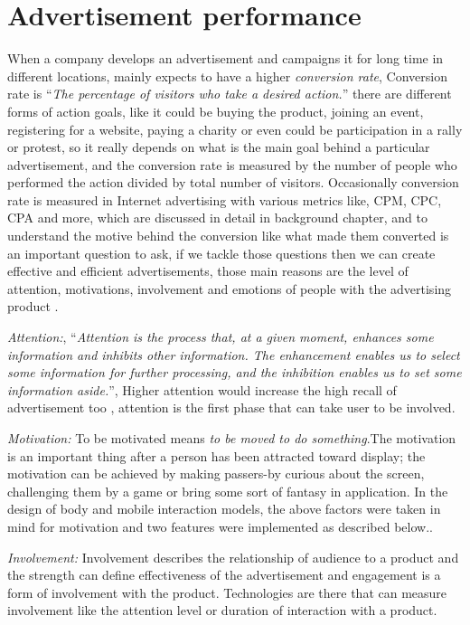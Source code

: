 \section{Advertisement performance}
When a company develops an advertisement and campaigns it for long time in different locations, mainly expects to have a higher \emph{conversion rate}, Conversion rate is ``\emph{The percentage of visitors who take a desired action.}''\cite{convrate} there are different forms of action goals, like it could be buying the product, joining an event, registering for a website, paying a charity or even could be participation in a rally or protest, so it really depends on what is the main goal behind a particular advertisement, and the conversion rate is measured by the number of people who performed the action divided by total number of visitors. Occasionally conversion rate is measured in Internet advertising with various metrics like, CPM, CPC, CPA and more, which are discussed in detail in background chapter, and to understand the motive behind the conversion like what made them converted is an important question to ask, if we tackle those questions then we can create effective and efficient advertisements, those main reasons are the level of attention, motivations, involvement and emotions of people with the advertising product \cite{pervasiv_ad}.

\emph{Attention:}, ``\emph{Attention is the process that, at a given moment, enhances some information and inhibits other information. The enhancement enables us to select some information for further processing, and the inhibition enables us to set some information aside.}''\cite{Attention}, Higher attention would increase the high recall of advertisement too \cite{add_effectivenss}, attention is the first phase that can take user to be involved.

\emph{Motivation:}
To be motivated means \emph{to be moved to do something}\cite{motiv}.The motivation is an important thing after a person has been attracted toward display; the motivation can be achieved by making passers-by curious about the screen, challenging them by a game or bring some sort of fantasy in application. In the design of body and mobile interaction models, the above factors were taken in mind for motivation and two features were implemented as described below.\cite{toward_motivation}. 

\emph{Involvement:} Involvement describes the relationship of audience to a product and the strength can define effectiveness of the advertisement and engagement is a form of involvement with the product. Technologies are there that can measure involvement like the attention level or duration of interaction with a product.

